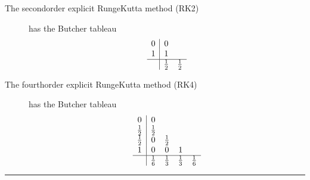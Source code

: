 \documentclass[letterpaper,10pt,english]{jupyterBook}
\begin{document}
\begin{description}
\item[{The second\sphinxhyphen{}order explicit Runge\sphinxhyphen{}Kutta method (RK2)\label{\detokenize{8_Appendices/8.0_Cheat_sheet:term-The-second-order-explicit-Runge-Kutta-method-RK2}}}] \leavevmode
\sphinxAtStartPar
{} {\hyperref[\detokenize{2_ERKs/2.1_ERK_Derivation:rk2-derivation-example}]{}} has the Butcher tableau
\begin{align*}
    \begin{array}{c|cc}
        0 & 0 \\ 
        1 & 1 \\ \hline
        & \frac{1}{2} & \frac{1}{2}
    \end{array}
\end{align*}
\item[{The fourth\sphinxhyphen{}order explicit Runge\sphinxhyphen{}Kutta method (RK4)\label{\detokenize{8_Appendices/8.0_Cheat_sheet:term-The-fourth-order-explicit-Runge-Kutta-method-RK4}}}] \leavevmode
\sphinxAtStartPar
{} {\hyperref[\detokenize{2_ERKs/2.2_RK4_Derivation:rk4-definition}]{}} has the Butcher tableau
\begin{align*}
    \begin{array}{c|cccc}
        0 & 0 \\
        \frac{1}{2} & \frac{1}{2} \\
        \frac{1}{2} & 0 & \frac{1}{2} \\ 
        1 & 0 & 0 & 1 \\ \hline
        & \frac{1}{6} & \frac{1}{3} & \frac{1}{3} & \frac{1}{6}
    \end{array}
\end{align*}
\end{description}


\bigskip\hrule\bigskip
\end{document}
